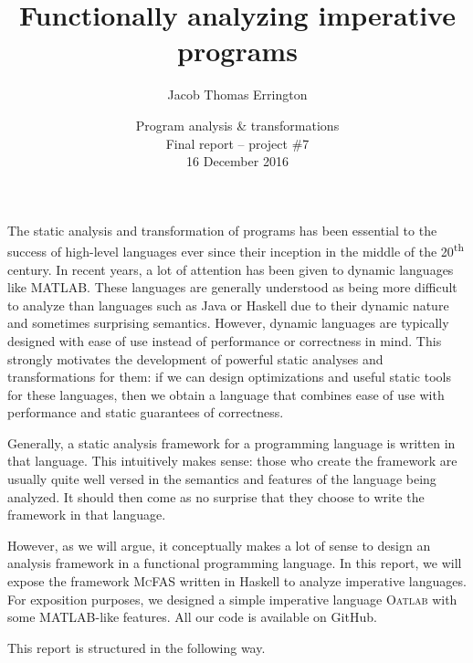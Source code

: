 \documentclass[letterpaper,11pt]{article}
\author{Jacob Thomas Errington}
\title{Functionally analyzing imperative programs}
\date{
  Program analysis \& transformations \\ Final report -- project \#7\\
  16 December 2016
}
\newcommand{\mcfas}{\textsc{McFAS}}
\newcommand{\matlab}{MATLAB}
\newcommand{\oatlab}{\textsc{Oatlab}}
\renewcommand{\th}{\textsuperscript{th}}
\begin{document}
\maketitle

The static analysis and transformation of programs has been essential to the
success of high-level languages ever since their inception in the middle of the
20\th{} century. In recent years, a lot of attention has been given to dynamic
languages like \matlab. These languages are generally understood as being more
difficult to analyze than languages such as Java or Haskell due to their
dynamic nature and sometimes surprising semantics. However, dynamic
languages are typically designed with ease of use instead of performance or
correctness in mind. This strongly motivates the development of powerful
static analyses and transformations for them: if we can design optimizations
and useful static tools for these languages, then we obtain a language that
combines ease of use with performance and static guarantees of correctness.

Generally, a static analysis framework for a programming language is written in
that language. This intuitively makes sense: those who create the framework are
usually quite well versed in the semantics and features of the language being
analyzed. It should then come as no surprise that they choose to write the
framework in that language.

However, as we will argue, it conceptually makes a lot of sense to design an
analysis framework in a functional programming language.
In this report, we will expose the framework \mcfas{} written in Haskell to
analyze imperative languages. For exposition purposes, we designed a simple
imperative language \oatlab{} with some \matlab-like features. All our code is
available on GitHub\footnotemark.

This report is structured in the following way.
\end{document}
